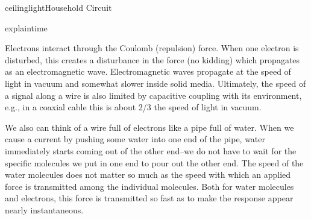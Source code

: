 \begin{mainquestion}{ceilinglight}{Household Circuit}
\begin{partquestion}{explaintime}
\begin{answer}
Electrons interact through the Coulomb (repulsion) force. When one electron is disturbed, this creates a disturbance in the force (no kidding) which propagates as an electromagnetic wave. Electromagnetic waves propagate at the speed of light in vacuum and somewhat slower inside solid media. Ultimately, the speed of a signal along a wire is also limited by capacitive coupling with its environment, e.g., in a coaxial cable this is about 2/3 the speed of light in vacuum.

We also can think of a wire full of electrons like a pipe full of water. When we cause a current by pushing some water into one end of the pipe, water immediately starts coming out of the other end–we do not have to wait for the specific molecules we put in one end to pour out the other end. The speed of the water molecules does not matter so much as the speed with which an applied force is transmitted among the individual molecules. Both for water molecules and electrons, this force is transmitted so fast as to make the response appear nearly instantaneous.
\end{answer}
\end{partquestion}

\end{mainquestion}